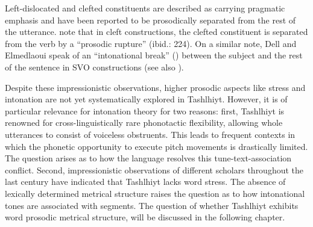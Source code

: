 Left-dislocated and clefted constituents are described as carrying pragmatic emphasis and have been reported to be prosodically separated from the rest of the utterance. \citet{MettouchiFleisch2010} note that in cleft constructions, the clefted constituent is separated from the verb by a “prosodic rupture” (ibid.: 224). On a similar note, Dell and Elmedlaoui speak of an “intonational break” (\citealt[17]{DE2002}) between the subject and the rest of the sentence in SVO constructions (see also \citealt{Shlonsky1987,Sadiqi1997,Boukhris.etal2008}).

Despite these impressionistic observations, higher prosodic aspects like stress and intonation are not yet systematically explored in Tashlhiyt. However, it is of particular relevance for intonation theory for two reasons: first, Tashlhiyt is renowned for cross-linguistically rare phonotactic flexibility, allowing whole utterances to consist of voiceless obstruents. This leads to frequent contexts in which the phonetic opportunity to execute pitch movements is drastically limited. The question arises as to how the language resolves this tune-text-association conflict. Second, impressionistic observations of different scholars throughout the last century have indicated that Tashlhiyt lacks word stress. The absence of lexically determined metrical structure raises the question as to how intonational tones are associated with segments. 
The question of whether Tashlhiyt exhibits word prosodic metrical structure, will be discussed in the following chapter.

